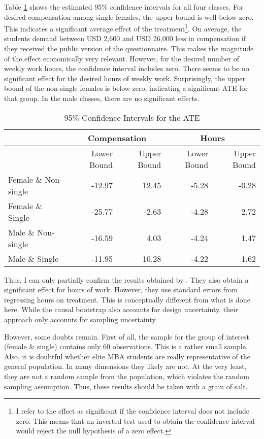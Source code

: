 \documentclass[aodsor,preprint]{imsart}
\numberwithin{equation}{section}
\theoremstyle{plain}
\begin{document}
Table \ref{CIs} shows the estimated 95\% confidence intervals for all four classes. For desired compensation among single females, the upper bound is well below zero. This indicates a significant average effect of the treatment\footnote{I refer to the effect as significant if the confidence interval does not include zero. This means that an inverted test used to obtain the confidence interval would reject the null hypothesis of a zero effect.}. On average, the students demand between USD 2,600 and USD 26,000 less in compensation if they received the public version of the questionnaire. This makes the magnitude of the effect economically very relevant. However, for the desired number of weekly work hours, the confidence interval includes zero. There seems to be no significant effect for the desired hours of weekly work. Surprisingly, the upper bound of the non-single females is below zero, indicating a significant ATE for that group. In the male classes, there are no significant effects.

\begin{table}[!h]
	\centering
	\caption{95\% Confidence Intervals for the ATE}
	\label{CIs}
	\begin{tabular}{l|r|r|r|r}
		\hline
		& \multicolumn{2}{c|}{Compensation} & \multicolumn{2}{|c}{Hours} \\
		\hline
		& Lower Bound & Upper Bound & Lower Bound & Upper Bound\\
		\hline
		Female \& Non-single & -12.97 & 12.45 & -5.28 & -0.28\\
		\hline
		Female \& Single & -25.77 & -2.63 & -4.28 & 2.72\\
		\hline
		Male \& Non-single & -16.59 & 4.03 & -4.24 & 1.47\\
		\hline
		Male \& Single & -11.95 & 10.28 & -4.22 & 1.62\\
		\hline
	\end{tabular}
\end{table}

Thus, I can only partially confirm the results obtained by \cite{Bursztyn_2017}. They also obtain a significant effect for hours of work. However, they use standard errors from regressing hours on treatment. This is conceptually different from what is done here. While the causal bootstrap also accounts for design uncertainty, their approach only accounts for sampling uncertainty.

However, some doubts remain. First of all, the sample for the group of interest (female \& single) contains only 60 observations. This is a rather small sample. Also, it is doubtful whether elite MBA students are really representative of the general population. In many dimensions they likely are not. At the very least, they are not a random sample from the population, which violates the random sampling assumption. Thus, these results should be taken with a grain of salt. 
\end{document}
